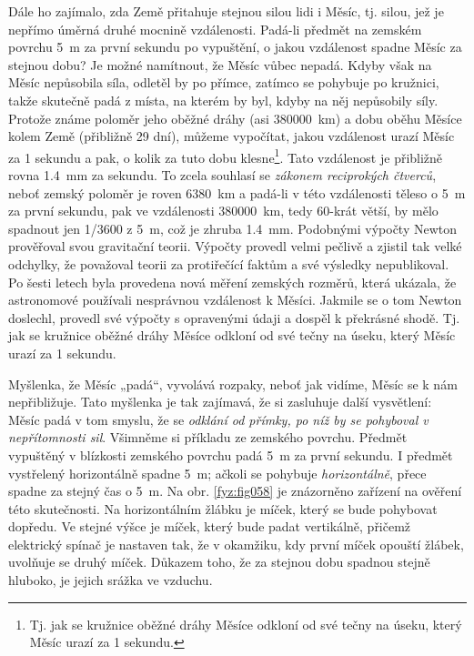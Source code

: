     Dále ho zajímalo, zda Země přitahuje stejnou silou lidi i Měsíc, tj. silou, jež je nepřímo 
    úměrná druhé mocnině vzdálenosti. Padá-li předmět na zemském povrchu \SI{5}{\m} za první 
    sekundu po vypuštění, o jakou vzdálenost spadne Měsíc za stejnou dobu? Je možné namítnout, že 
    Měsíc vůbec nepadá. Kdyby však na Měsíc nepůsobila síla, odletěl by po přímce, zatímco se 
    pohybuje po kružnici, takže skutečně padá z místa, na kterém by byl, kdyby na něj nepůsobily 
    síly. Protože známe poloměr jeho oběžné dráhy (asi \SI{380000}{\km}) a dobu oběhu Měsíce kolem 
    Země (přibližně \num{29} dní), můžeme vypočítat, jakou vzdálenost urazí Měsíc za \num{1} 
    sekundu a pak, o kolik za tuto dobu klesne\footnote{Tj. jak se kružnice oběžné dráhy Měsíce 
    odkloní od své tečny na úseku, který Měsíc urazí za 1 sekundu.}. Tato vzdálenost je přibližně 
    rovna \SI{1.4}{\mm} za sekundu. To zcela souhlasí se \emph{zákonem reciprokých čtverců}, neboť 
    zemský poloměr je roven \SI{6380}{\km} a padá-li v této vzdálenosti těleso o \SI{5}{\m} za 
    první sekundu, pak ve vzdálenosti \SI{380000}{\km}, tedy \num{60}-krát větší, by mělo spadnout 
    jen \num{1/3600} z \SI{5}{\m}, což je zhruba \SI{1.4}{\mm}. Podobnými výpočty Newton prověřoval 
    svou gravitační teorii. Výpočty provedl velmi pečlivě a zjistil tak velké odchylky, že 
    považoval teorii za protiřečící faktům a své výsledky nepublikoval. Po šesti letech byla 
    provedena nová měření zemských rozměrů, která ukázala, že astronomové používali nesprávnou 
    vzdálenost k Měsíci. Jakmile se o tom Newton doslechl, provedl své výpočty s opravenými údaji a 
    dospěl k překrásné shodě. Tj. jak se kružnice oběžné dráhy Měsíce odkloní od své tečny na 
    úseku, který Měsíc urazí za \num{1} sekundu.
    
    Myšlenka, že Měsíc „padá“, vyvolává rozpaky, neboť jak vidíme, Měsíc se k nám nepřibližuje. 
    Tato myšlenka je tak zajímavá, že si zasluhuje další vysvětlení: Měsíc padá v tom smyslu, že se 
    \emph{odklání od přímky, po níž by se pohyboval v nepřítomnosti sil}. Všimněme si příkladu ze 
    zemského povrchu. Předmět vypuštěný v blízkosti zemského povrchu padá \SI{5}{\m} za první 
    sekundu. I předmět vystřelený horizontálně spadne \SI{5}{\m}; ačkoli se pohybuje 
    \emph{horizontálně}, přece spadne za stejný čas o \SI{5}{\m}. Na obr. \ref{fyz:fig058} je 
    znázorněno zařízení na ověření této skutečnosti. Na horizontálním žlábku je míček, který se 
    bude pohybovat dopředu. Ve stejné výšce je míček, který bude padat vertikálně, přičemž 
    elektrický spínač je nastaven tak, že v okamžiku, kdy první míček opouští žlábek, uvolňuje se 
    druhý míček. Důkazem toho, že za stejnou dobu spadnou stejně hluboko, je jejich srážka ve 
    vzduchu.
    
